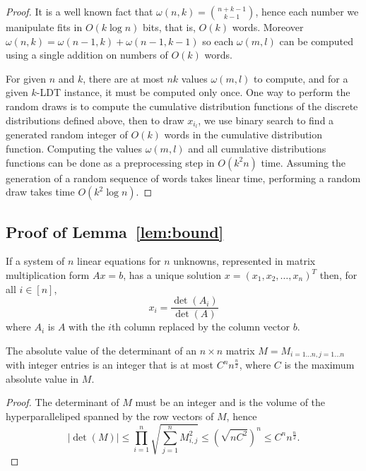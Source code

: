 \begin{proof}
	It is a well known fact that $\omega(n,k)=\binom{n+k-1}{k-1}$, hence each
	number we manipulate fits in $O(k \log n)$ bits, that is, $O(k)$ words.
	Moreover $\omega(n,k) = \omega(n-1,k) + \omega(n-1,k-1)$ so each
	$\omega(m,l)$ can be computed using a single addition on numbers of $O(k)$
	words.

	For given $n$ and $k$, there are at most $nk$ values $\omega(m,l)$ to
	compute, and for a given $k$-LDT instance, it must be computed only once.
	One way to perform the random draws is to compute the cumulative
	distribution functions of the discrete distributions defined above, then to
	draw $x_{i_l}$, we use binary search to find a generated random integer of
	$O(k)$ words in the cumulative distribution function. Computing the
	values $\omega(m,l)$ and all cumulative distributions functions can be done
	as a preprocessing step in $O(k^2 n)$ time. Assuming the generation
	of a random sequence of words takes linear time, performing a random draw
	takes time $O(k^2 \log n)$.

\end{proof}

\subsection{Proof of Lemma~\ref*{lem:bound}}
\label{app:bound}

\begin{theorem}\label{thm:cramer}
	If a system of $n$ linear equations for $n$ unknowns, represented in matrix
	multiplication form $Ax=b$,
	has a unique solution $x=(x_1,x_2,\ldots,x_n)^T$ then, for all $i \in [n]$,
	$$
		x_i = \frac{\det(A_i)}{\det(A)}
	$$
	where $A_i$ is $A$ with the $i$th column replaced by the column vector $b$.
\end{theorem}

\begin{lemma}\label{lem:detZ}
	The absolute value of the determinant of an $n\times n$ matrix $M =
	M_{i=1\ldots n,j=1\ldots n}$ with integer entries is an integer that is at
	most $C^n n^{\frac n2}$, where $C$ is the maximum absolute value in $M$.
\end{lemma}
\begin{proof}
	The determinant of $M$ must be an integer
	and is the volume of the
	hyperparalleliped spanned by the row vectors of $M$, hence
	$$
	|\det(M)| \le \prod_{i=1}^n \sqrt{\sum_{j=1}^{n} M_{i,j}^2} \le {(\sqrt{n C^2})}^{n} \le C^n n^\frac n2.
	$$
\end{proof}

